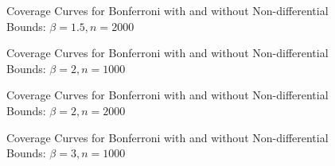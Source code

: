 \begin{figure}
  \centering
  
  \caption{Coverage Curves for Bonferroni with and without Non-differential Bounds:  $\beta = 1.5, n = 2000$}
\end{figure}
\begin{figure}
  \centering
  
  \caption{Coverage Curves for Bonferroni with and without Non-differential Bounds: $\beta = 2, n = 1000$}
\end{figure}

\begin{figure}
  \centering
  
  \caption{Coverage Curves for Bonferroni with and without Non-differential Bounds: $\beta = 2, n = 2000$}
\end{figure}
\begin{figure}
  \centering
  
  \caption{Coverage Curves for Bonferroni with and without Non-differential Bounds: $\beta = 3, n = 1000$}
\end{figure}

